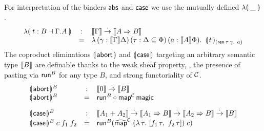 \documentclass[a4paper,USenglish,cleveref, autoref]{lipics-v2019}
\begin{document}
For interpretation of the binders $\tabs$ and $\tcase$ we use the
mutually defined $\fden{\_}$.
\[
\begin{array}{lcl}
  \fden{t : B \from \cext \Gamma A}
    & : & \den \Gamma \todot \den{A \To B} \\
    & = &
      \lambda\, (\gamma : \den \Gamma \Delta)
      \,(\tau : \Delta \sublist \Phi)
      \,(a : \den A \Phi)
      .\ \,
      \dent t {(\tren\,\tau\,\gamma,\ a)} \\
\end{array}
\]
The coproduct eliminations $\denabort$ and $\dencase$
targeting an arbitrary semantic type $\den B$ are definable thanks to
the weak sheaf property, \ie, the presence of pasting via $\trun^B$
for any type $B$, and strong functoriality of $\C$.
\[
\begin{array}{lcl}
  \denabort^B & : & \den \tyzero \todot \den B \\
  \denabort^B & = & \trun^B \comp \tmap[\C]\,\tmagic
\\[2ex]
  \dencase^B  & : & \den{A_1 + A_2}
    \todot \den{A_1 \To B}
    \todot \den{A_2 \To B}
    \todot \den{B} \\
  \dencase^B\;c\;f_1\;f_2 & = &
    \trun^B (\stmap[\C]\;(\lambda\,\tau.\ [f_1\,\tau,\ f_2\,\tau])\;c) \\
\end{array}
\]
\end{document}
